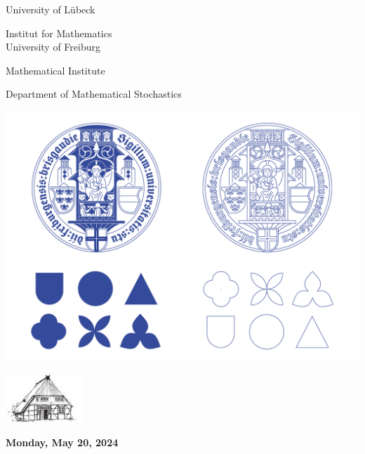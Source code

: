 \documentclass[12pt,a4paper]{article}
\newcommand{\Kopf}{%
\begin{center}%
\includegraphics[width=.2\textwidth]{logo-tsh}\\[2ex]
\end{center}
}
\begin{document}
{\begin{center}
{\begin{minipage}[c]{.6\textwidth}
\begin{center}
University of Lübeck\par
Institut for Mathematics
\\[1.25ex]
%  
  University of Freiburg \par  
  Mathematical Institute \par 
  Department of Mathematical Stochastics 
 \end{center}
 \end{minipage}%
 }
\hfill%
%
{\begin{minipage}[c]{.19\textwidth} 
{\bigskip\medskip
\begin{center}%
{\includegraphics[width=1.3\textwidth]{UFR-vorlage-designsystem-elemente-uebersicht.png}}
\end{center}}
\end{minipage}
}
\end{center}
}

\pagebreak 
\pagestyle{headings}
\renewcommand{\arraystretch}{1.85}

\Kopf
\vspace*{.75cm}

\textbf{\Large  Monday, May 20, 2024}\medskip
\end{document}

